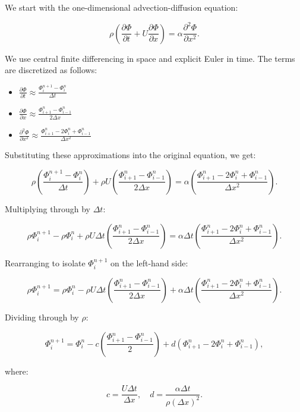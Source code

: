 \documentclass{article}
\begin{document}
We start with the one-dimensional advection-diffusion equation:

\[
\rho \left( \frac{\partial \Phi}{\partial t} + U \frac{\partial \Phi}{\partial x} \right) = \alpha \frac{\partial^2 \Phi}{\partial x^2}.
\]

We use central finite differencing in space and explicit Euler in time. The terms are discretized as follows:

\begin{itemize}
    \item \(\frac{\partial \Phi}{\partial t} \approx \frac{\Phi_i^{n+1} - \Phi_i^n}{\Delta t}\)
    \item \(\frac{\partial \Phi}{\partial x} \approx \frac{\Phi_{i+1}^n - \Phi_{i-1}^n}{2\Delta x}\)
    \item \(\frac{\partial^2 \Phi}{\partial x^2} \approx \frac{\Phi_{i+1}^n - 2\Phi_i^n + \Phi_{i-1}^n}{\Delta x^2}\)
\end{itemize}

Substituting these approximations into the original equation, we get:

\[
\rho \left( \frac{\Phi_i^{n+1} - \Phi_i^n}{\Delta t} \right) + \rho U \left( \frac{\Phi_{i+1}^n - \Phi_{i-1}^n}{2\Delta x} \right) = \alpha \left( \frac{\Phi_{i+1}^n - 2\Phi_i^n + \Phi_{i-1}^n}{\Delta x^2} \right).
\]

Multiplying through by \(\Delta t\):

\[
\rho \Phi_i^{n+1} - \rho \Phi_i^n + \rho U \Delta t \left( \frac{\Phi_{i+1}^n - \Phi_{i-1}^n}{2\Delta x} \right) = \alpha \Delta t \left( \frac{\Phi_{i+1}^n - 2\Phi_i^n + \Phi_{i-1}^n}{\Delta x^2} \right).
\]

Rearranging to isolate \(\Phi_i^{n+1}\) on the left-hand side:

\[
\rho \Phi_i^{n+1} = \rho \Phi_i^n - \rho U \Delta t \left( \frac{\Phi_{i+1}^n - \Phi_{i-1}^n}{2\Delta x} \right) + \alpha \Delta t \left( \frac{\Phi_{i+1}^n - 2\Phi_i^n + \Phi_{i-1}^n}{\Delta x^2} \right).
\]

Dividing through by \(\rho\):

\begin{equation}
  \label{eq:discretized}
\Phi_i^{n+1} = \Phi_i^n - c \left( \frac{\Phi_{i+1}^n - \Phi_{i-1}^n}{2} \right) + d \left( \Phi_{i+1}^n - 2\Phi_i^n + \Phi_{i-1}^n \right),
\end{equation}

where:

\[
c = \frac{U \Delta t}{\Delta x}, \quad d = \frac{\alpha \Delta t}{\rho (\Delta x)^2}.
\]
\end{document}
